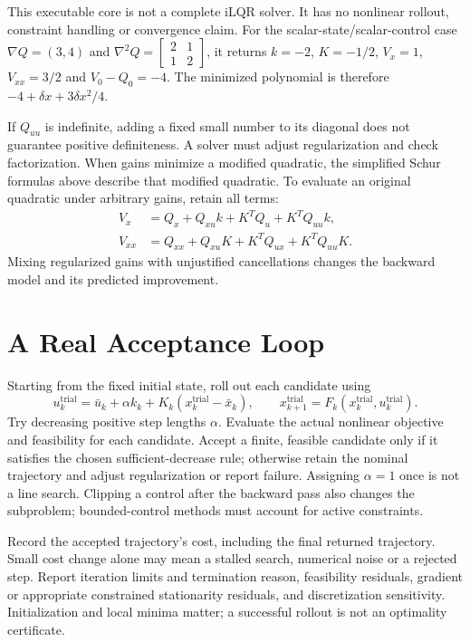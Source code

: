 This executable core is not a complete iLQR solver. It has no nonlinear rollout,
constraint handling or convergence claim. For the scalar-state/scalar-control
case $\nabla Q=(3,4)$ and $\nabla^2Q=\left[\begin{smallmatrix}2&1\\1&2\end{smallmatrix}\right]$,
it returns $k=-2$, $K=-1/2$, $V_x=1$, $V_{xx}=3/2$ and $V_0-Q_0=-4$.
The minimized polynomial is therefore $-4+\delta x+3\delta x^2/4$.

If $Q_{uu}$ is indefinite, adding a fixed small number to its diagonal does not
guarantee positive definiteness. A solver must adjust regularization and check
factorization. When gains minimize a modified quadratic, the simplified Schur
formulas above describe that modified quadratic. To evaluate an original
quadratic under arbitrary gains, retain all terms:
\begin{align*}
 V_x&=Q_x+Q_{xu}k+K^TQ_u+K^TQ_{uu}k,\\
 V_{xx}&=Q_{xx}+Q_{xu}K+K^TQ_{ux}+K^TQ_{uu}K.
\end{align*}
Mixing regularized gains with unjustified cancellations changes the backward
model and its predicted improvement.

\section{A Real Acceptance Loop}

Starting from the fixed initial state, roll out each candidate using
\[
 u_k^{\mathrm{trial}}=\bar u_k+\alpha k_k+
 K_k(x_k^{\mathrm{trial}}-\bar x_k),\qquad
 x_{k+1}^{\mathrm{trial}}=F_k(x_k^{\mathrm{trial}},u_k^{\mathrm{trial}}).
\]
Try decreasing positive step lengths $\alpha$. Evaluate the actual nonlinear
objective and feasibility for each candidate. Accept a finite, feasible candidate
only if it satisfies the chosen sufficient-decrease rule; otherwise retain the
nominal trajectory and adjust regularization or report failure. Assigning
$\alpha=1$ once is not a line search. Clipping a control after the backward pass
also changes the subproblem; bounded-control methods must account for active
constraints.

Record the accepted trajectory's cost, including the final returned trajectory.
Small cost change alone may mean a stalled search, numerical noise or a rejected
step. Report iteration limits and termination reason, feasibility residuals,
gradient or appropriate constrained stationarity residuals, and discretization
sensitivity. Initialization and local minima matter; a successful rollout is
not an optimality certificate.

